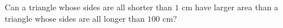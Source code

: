 Can a triangle whose sides are all shorter than $1$ cm have larger area than a triangle whose sides are all longer than $100$ cm?
